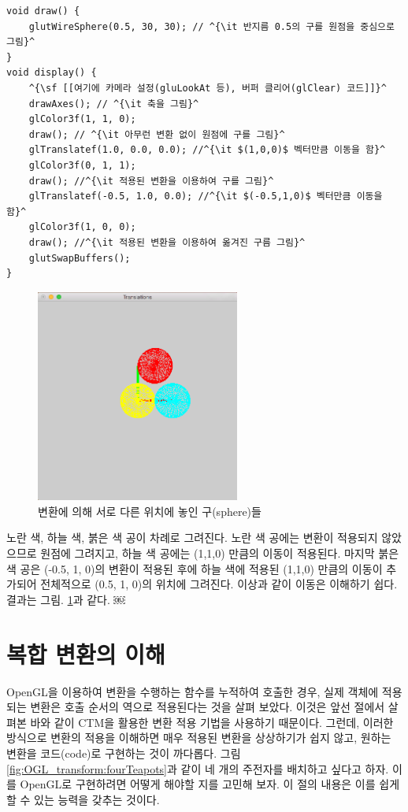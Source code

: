 \begin{algorithmbis}[이동 변환의 적용]\label{code:OGL_transform:translate}
\lstset{language=C++, escapechar=^} 
\begin{lstlisting}
void draw() {
    glutWireSphere(0.5, 30, 30); // ^{\it 반지름 0.5의 구를 원점을 중심으로 그림}^
}
void display() {
    ^{\sf [[여기에 카메라 설정(gluLookAt 등), 버퍼 클리어(glClear) 코드]]}^
    drawAxes(); // ^{\it 축을 그림}^
    glColor3f(1, 1, 0);
    draw(); // ^{\it 아무런 변환 없이 원점에 구를 그림}^
    glTranslatef(1.0, 0.0, 0.0); //^{\it $(1,0,0)$ 벡터만큼 이동을 함}^
    glColor3f(0, 1, 1);
    draw(); //^{\it 적용된 변환을 이용하여 구를 그림}^
    glTranslatef(-0.5, 1.0, 0.0); //^{\it $(-0.5,1,0)$ 벡터만큼 이동을 함}^
    glColor3f(1, 0, 0);
    draw(); //^{\it 적용된 변환을 이용하여 옮겨진 구름 그림}^
    glutSwapBuffers();
}
\end{lstlisting}
\end{algorithmbis}

\begin{figure}[h!]
  \centering
    \includegraphics[height=7cm]{OGL_transform/transformedBalls.png}
    \caption{변환에 의해 서로 다른 위치에 놓인 구(sphere)들}
    \label{fig:OGL_transform:transformedBalls}
\end{figure}

노란 색, 하늘 색, 붉은 색 공이 차례로 그려진다.  노란 색 공에는 변환이 적용되지 않았으므로 원점에 그려지고, 하늘 색 공에는 (1,1,0) 만큼의 이동이 적용된다. 마지막 붉은 색 공은 (-0.5, 1, 0)의 변환이 적용된 후에 하늘 색에 적용된 (1,1,0) 만큼의 이동이 추가되어 전체적으로 (0.5, 1, 0)의 위치에 그려진다. 이상과 같이 이동은 이해하기 쉽다. 결과는 그림. \ref{fig:OGL_transform:transformedBalls}과 같다.
￼






\section{복합 변환의 이해}
OpenGL을 이용하여 변환을 수행하는 함수를 누적하여 호출한 경우, 실제 객체에 적용되는 변환은 호출 순서의 역으로 적용된다는 것을 살펴 보았다.
이것은 앞선 절에서 살펴본 바와 같이 CTM을 활용한 변환 적용 기법을 사용하기 때문이다. 그런데, 이러한 방식으로 변환의 적용을 이해하면 매우 적용된 변환을 상상하기가 쉽지 않고, 원하는 변환을 코드(code)로 구현하는 것이 까다롭다. 그림 \ref{fig:OGL_transform:fourTeapots}과 같이 네 개의 주전자를 배치하고 싶다고 하자. 이를 OpenGL로 구현하려면 어떻게 해야할 지를 고민해 보자. 이 절의 내용은 이를 쉽게 할 수 있는 능력을 갖추는 것이다.

